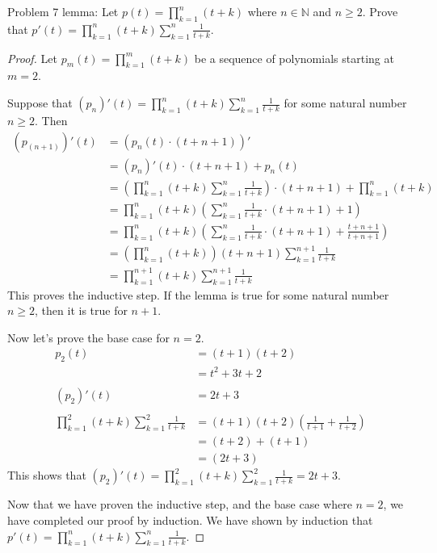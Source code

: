 \usepackage{amsthm}

Problem 7 lemma: Let $\displaystyle p(t) = \prod_{k=1}^{n} (t+k)$ where $n \in \mathbb{N}$ and $n \geq 2$. Prove that $\displaystyle p'(t) = \prod_{k=1}^{n} (t+k) \sum_{k=1}^{n} \frac{1}{t + k}$.

\begin{proof}
Let $\displaystyle p_{m}(t) = \prod_{k=1}^{m} (t+k)$ be a sequence of polynomials starting at $m = 2$. 

Suppose that $\displaystyle (p_{n})'(t) = \prod_{k=1}^{n} (t+k) \sum_{k=1}^{n} \frac{1}{t + k}$ for some natural number $n \geq 2$. Then
\begin{align*}
(p_{(n+1)})'(t) &= \left( p_{n}(t) \cdot (t + n + 1) \right)' \\
&= (p_{n})'(t) \cdot (t + n + 1) + p_{n}(t) \\
&= \left( \prod_{k=1}^{n} (t+k) \sum_{k=1}^{n} \frac{1}{t + k} \right) \cdot (t + n + 1) + \prod_{k=1}^{n} (t+k) \\
&= \prod_{k=1}^{n} (t+k) \left( \sum_{k=1}^{n} \frac{1}{t + k} \cdot (t + n + 1) + 1 \right) \\
&= \prod_{k=1}^{n} (t+k) \left( \sum_{k=1}^{n} \frac{1}{t + k} \cdot (t + n + 1) + \frac{t + n + 1}{t + n + 1} \right) \\
&= \left( \prod_{k=1}^{n} (t+k) \right) (t + n + 1) \sum_{k=1}^{n+1} \frac{1}{t + k} \\
&= \prod_{k=1}^{n+1} (t+k) \sum_{k=1}^{n+1} \frac{1}{t + k}
\end{align*}
This proves the inductive step. If the lemma is true for some natural number $n \geq 2$, then it is true for $n + 1$.

Now let's prove the base case for $n = 2$.
\begin{align*}
p_{2}(t) &= (t + 1)(t + 2) \\
&= t^2 + 3t + 2 \\ \\
(p_{2})'(t) &= 2t + 3 \\ \\
\prod_{k=1}^{2} (t+k) \sum_{k=1}^{2} \frac{1}{t + k} &= (t + 1)(t + 2)\left(\frac{1}{t + 1} + \frac{1}{t + 2}\right) \\
&= (t + 2) + (t + 1) \\
&= (2t + 3)
\end{align*}
This shows that $\displaystyle (p_{2})'(t) = \prod_{k=1}^{2} (t+k) \sum_{k=1}^{2} \frac{1}{t + k} = 2t + 3$.

Now that we have proven the inductive step, and the base case where $n = 2$, we have completed our proof by induction. We have shown by induction that $\displaystyle p'(t) = \prod_{k=1}^{n} (t+k) \sum_{k=1}^{n} \frac{1}{t + k}$.

\end{proof}
